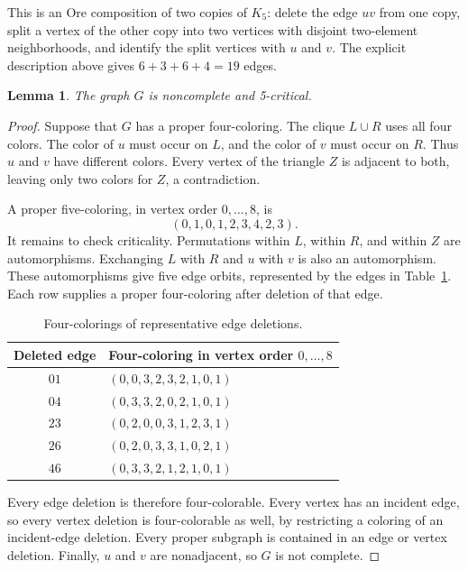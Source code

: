 \documentclass[11pt]{article}
\newtheorem{lemma}{Lemma}
\begin{document}
This is an Ore composition of two copies of $K_5$: delete the edge
$uv$ from one copy, split a vertex of the other copy into two
vertices with disjoint two-element neighborhoods, and identify
the split vertices with $u$ and $v$. The explicit description
above gives $6+3+6+4=19$ edges.

\begin{lemma}\label{lem:host}
The graph $G$ is noncomplete and 5-critical.
\end{lemma}

\begin{proof}
Suppose that $G$ has a proper four-coloring. The clique $L\cup R$
uses all four colors. The color of $u$ must occur on $L$, and
the color of $v$ must occur on $R$. Thus $u$ and $v$ have different
colors. Every vertex of the triangle $Z$ is adjacent to both,
leaving only two colors for $Z$, a contradiction.

A proper five-coloring, in vertex order $0,\ldots,8$, is
\[
 (0,1,0,1,2,3,4,2,3).
\]
It remains to check criticality. Permutations within $L$, within
$R$, and within $Z$ are automorphisms. Exchanging $L$ with $R$
and $u$ with $v$ is also an automorphism. These automorphisms
give five edge orbits, represented by the edges in
Table~\ref{tab:deletions}. Each row supplies a proper
four-coloring after deletion of that edge.

\begin{table}[ht]
\centering
\small
\begin{tabular}{cl}
\toprule
Deleted edge & Four-coloring in vertex order $0,\ldots,8$\\
\midrule
$01$ & $(0,0,3,2,3,2,1,0,1)$\\
$04$ & $(0,3,3,2,0,2,1,0,1)$\\
$23$ & $(0,2,0,0,3,1,2,3,1)$\\
$26$ & $(0,2,0,3,3,1,0,2,1)$\\
$46$ & $(0,3,3,2,1,2,1,0,1)$\\
\bottomrule
\end{tabular}
\caption{Four-colorings of representative edge deletions.}
\label{tab:deletions}
\end{table}

Every edge deletion is therefore four-colorable. Every vertex has
an incident edge, so every vertex deletion is four-colorable as
well, by restricting a coloring of an incident-edge deletion.
Every proper subgraph is contained in an edge or vertex deletion.
Finally, $u$ and $v$ are nonadjacent, so $G$ is not complete.
\end{proof}
\end{document}
